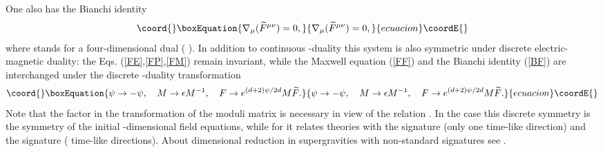 \documentclass[a4paper,12pt]{article}
\begin{document}
One also has the Bianchi identity
\begin{equation}\coord{}\boxEquation{\label{BF}
\nabla_\mu (\widetilde F^{\mu\nu}) = 0,
}{\nabla_\mu (\widetilde F^{\mu\nu}) = 0,
}{ecuacion}\coordE{}\end{equation}
where \coordHE{} stands for a four-dimensional dual (
\coordHE{}). In addition to continuous
\coordHE{}-duality \coordHE{} this system is also
symmetric under discrete electric-magnetic duality: the Eqs.
(\ref{FE},\ref{FP},\ref{FM}) remain invariant, while the Maxwell
equation (\ref{FF}) and the Bianchi identity (\ref{BF}) are
interchanged under the discrete \coordHE{}-duality transformation
\begin{equation}\coord{}\boxEquation{
\psi \to -\psi, \quad M \to \epsilon M^{-1}, \quad F \to
e^{(d+2)\psi/2d} M \widetilde F.
}{
\psi \to -\psi, \quad M \to \epsilon M^{-1}, \quad F \to
e^{(d+2)\psi/2d} M \widetilde F.
}{ecuacion}\coordE{}\end{equation}
Note that the factor \myHighlight{$\epsilon$}\coordHE{} in the transformation of the
moduli matrix is necessary in view of the relation \coordHE{}. In the case \coordHE{} this discrete symmetry
is the symmetry of the initial \coordHE{}-dimensional field
equations, while for \coordHE{} it relates theories with the
signature \coordHE{} (only one time-like
direction) and the signature \coordHE{}
(\coordHE{} time-like directions). About dimensional reduction in
supergravities with non-standard signatures see
\cite{Bar97,Nish98}.
\end{document}
